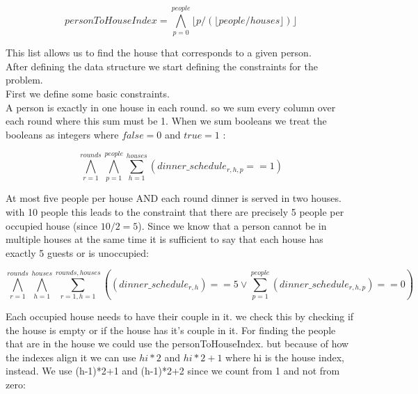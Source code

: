 \documentclass[12pt]{article}
\begin{document}
\[ personToHouseIndex = \bigwedge_{p=0}^{people} \lfloor p / (\lfloor people / houses \rfloor)\rfloor \]

This list allows us to find the house that corresponds to a given person. \\

After defining the data structure we start defining the constraints for the problem. \\
First we define some basic constraints. \\

A person is exactly in one house in each round. so we sum every column over each round where this sum must be 1. When we sum booleans we treat the booleans as integers where $false = 0$ and $true =1$ :

\[ \bigwedge_{r = 1}^{rounds} \bigwedge_{p = 1}^{people}  \sum_{h = 1}^{houses} \left( dinner\_schedule_{r,h,p} == 1 \right) \]


At most five people per house AND each round dinner is served in two houses. with 10 people this leads to the constraint that there are precisely 5 people per occupied house (since $10/2=5$).
Since we know that a person cannot be in multiple houses at the same time it is sufficient to say that each house has exactly 5 guests or is unoccupied:

\[ \bigwedge_{r = 1}^{rounds} \bigwedge_{h = 1}^{houses} \sum_{r=1,h=1}^{rounds,houses} \left( \left( {dinner\_schedule_{r,h}} \right) == 5 \lor \sum_{p=1}^{people} \left( {dinner\_schedule_{r,h,p}} \right) == 0 \right) \]

Each occupied house needs to have their couple in it. we check this by checking if the house is empty or if the house has it's couple in it. 
For finding the people that are in the house we could use the personToHouseIndex. but because of how the indexes align it we can use $hi*2$ and $hi*2+1$ where hi is the house index, instead. We use (h-1)*2+1 and (h-1)*2+2 since we count from 1 and not from zero:
\end{document}

